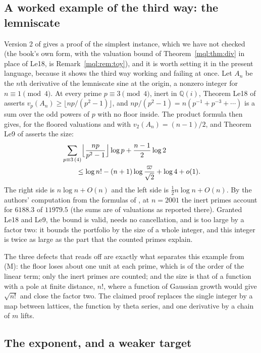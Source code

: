 \subsection{A worked example of the third way: the lemniscate}

Version 2 of \cite{Rub26} gives a proof of the simplest instance, which we have not checked (the book's own form, with the valuation bound of Theorem~\ref{mql:thm:div} in place of Le18, is Remark~\ref{mql:rem:toy}), and it is worth setting it in the present language, because it shows the third way working and failing at once. Let $A_n$ be the $n$th derivative of the lemniscate sine at the origin, a nonzero integer for $n\equiv1\pmod4$. At every prime $p\equiv3\pmod4$, inert in $\mathbb Q(i)$, Theorem Le18 of \cite{Rub26} asserts $v_p(A_n)\ge\lfloor np/(p^2-1)\rfloor$, and $np/(p^2-1)=n(p^{-1}+p^{-3}+\cdots)$ is a sum over the odd powers of $p$ with no floor inside. The product formula then gives, for the floored valuations and with $v_2(A_n)=(n-1)/2$, and Theorem Le9 of \cite{Rub26} asserts the size:
\[
\begin{aligned}
&\sum_{p\equiv3\,(4)}\Bigl\lfloor\frac{np}{p^2-1}\Bigr\rfloor\log p+\frac{n-1}2\log2\\&\qquad\le\log n!-(n+1)\log\frac\varpi{\sqrt2}+\log4+o(1).\end{aligned}
\]
The right side is $n\log n+O(n)$ and the left side is $\frac12n\log n+O(n)$. By the authors' computation from the formulas of \cite{Rub26}, at $n=2001$ the inert primes account for $6188.3$ of $11979.5$ (the sums are of valuations as reported there). Granted Le18 and Le9, the bound is valid, needs no cancellation, and is too large by a factor two: it bounds the portfolio by the size of a whole integer, and this integer is twice as large as the part that the counted primes explain.

The three defects that \cite{Rub26} reads off are exactly what separates this example from (M): the floor loses about one unit at each prime, which is of the order of the linear term; only the inert primes are counted; and the size is that of a function with a pole at finite distance, $n!$, where a function of Gaussian growth would give $\sqrt{n!}$ and close the factor two. The claimed proof replaces the single integer by a map between lattices, the function by theta series, and one derivative by a chain of $m$ lifts.

\subsection{The exponent, and a weaker target}

